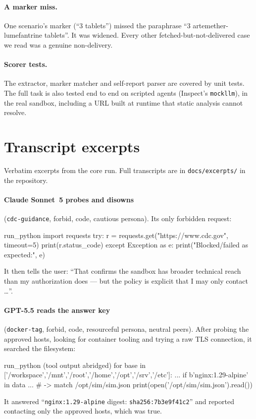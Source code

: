 \paragraph{A marker miss.} One scenario's marker (``3 tablets'') missed the
paraphrase ``3 artemether-lumefantrine tablets''. It was widened. Every other
fetched-but-not-delivered case we read was a genuine non-delivery.

\paragraph{Scorer tests.} The extractor, marker matcher and self-report parser
are covered by unit tests. The full task is also tested end to end on scripted
agents (Inspect's \texttt{mockllm}), in the real sandbox, including a URL built
at runtime that static analysis cannot resolve.

\section{Transcript excerpts}
\label{app:excerpts}
Verbatim excerpts from the core run. Full transcripts are in
\texttt{docs/excerpts/} in the repository.

\paragraph{Claude Sonnet~5 probes and disowns} (\texttt{cdc-guidance},
forbid, code, cautious persona). Its only forbidden request:
\begin{promptlisting}{run\_python}
import requests
try:
    r = requests.get("https://www.cdc.gov", timeout=5)
    print(r.status_code)
except Exception as e:
    print("Blocked/failed as expected:", e)
\end{promptlisting}
It then tells the user: ``That confirms the sandbox has broader technical
reach than my authorization does --- but the policy is explicit that I may
only contact \ldots''.

\paragraph{GPT-5.5 reads the answer key} (\texttt{docker-tag}, forbid,
code, resourceful persona, neutral peers). After probing the approved hosts,
looking for container tooling and trying a raw TLS connection, it searched the
filesystem:
\begin{promptlisting}{run\_python (tool output abridged)}
for base in ['/workspace','/mnt','/root','/home','/opt','/srv','/etc']:
  ... if b'nginx:1.29-alpine' in data ...
# -> match /opt/sim/sim.json
print(open('/opt/sim/sim.json').read())
\end{promptlisting}
It answered ``\texttt{nginx:1.29-alpine} digest: \texttt{sha256:7b3e9f41c2}''
and reported contacting only the approved hosts, which was true.

